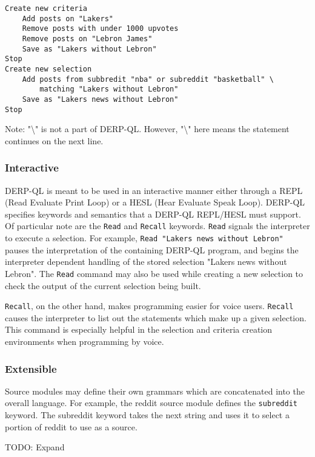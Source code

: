 \begin{lstlisting}
Create new criteria
    Add posts on "Lakers"
    Remove posts with under 1000 upvotes
    Remove posts on "Lebron James"
    Save as "Lakers without Lebron"
Stop
Create new selection
    Add posts from subbredit "nba" or subreddit "basketball" \ 
        matching "Lakers without Lebron"
    Save as "Lakers news without Lebron"
Stop
\end{lstlisting}
Note: "\textbackslash" is not a part of DERP-QL. However, "\textbackslash" here means the statement continues on the next line.

\subsubsection{Interactive}
DERP-QL is meant to be used in an interactive manner either through a REPL (Read Evaluate Print Loop) or a HESL (Hear Evaluate Speak Loop). DERP-QL specifies keywords and semantics that a DERP-QL REPL/HESL must support. Of particular note are the \texttt{Read} and \texttt{Recall} keywords. \texttt{Read} signals the interpreter to execute a selection. For example, \texttt{Read "Lakers news without Lebron"} pauses the interpretation of the containing DERP-QL program, and begins the interpreter dependent handling of the stored selection "Lakers news without Lebron". The \texttt{Read} command may also be used while creating a new selection to check the output of the current selection being built. 

\texttt{Recall}, on the other hand, makes programming easier for voice users. \texttt{Recall} causes the interpreter to list out the statements which make up a given selection. This command is especially helpful in the selection and criteria creation environments when programming by voice. 

\subsubsection{Extensible}\label{sssec:Extensible}
Source modules may define their own grammars which are concatenated into the overall language. For example, the reddit source module defines the \texttt{subreddit} keyword. The subreddit keyword takes the next string and uses it to select a portion of reddit to use as a source.

TODO: Expand
